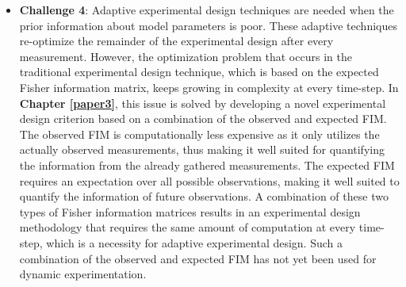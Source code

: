 \begin{itemize}
		\item \textbf{Challenge 4}: Adaptive experimental design techniques are needed when the prior information about model parameters is poor. These adaptive techniques re-optimize the remainder of the experimental design after every measurement. However, the optimization problem that occurs in the traditional experimental design technique, which is based on the expected Fisher information matrix, keeps growing in complexity at every time-step. In \textbf{Chapter \ref{paper3}}, this issue is solved by developing a novel experimental design criterion based on a combination of the observed and expected FIM. The observed FIM is computationally less expensive as it only utilizes the actually observed measurements, thus making it well suited for quantifying the information from the already gathered measurements. The expected FIM requires an expectation over all possible observations, making it well suited to quantify the information of future observations. A combination of these two types of Fisher information matrices results in an experimental design methodology that requires the same amount of computation at every time-step, which is a necessity for adaptive experimental design. {\color{red} Such a combination of the observed and expected FIM has not yet been used for dynamic experimentation.}
	\end{itemize} 